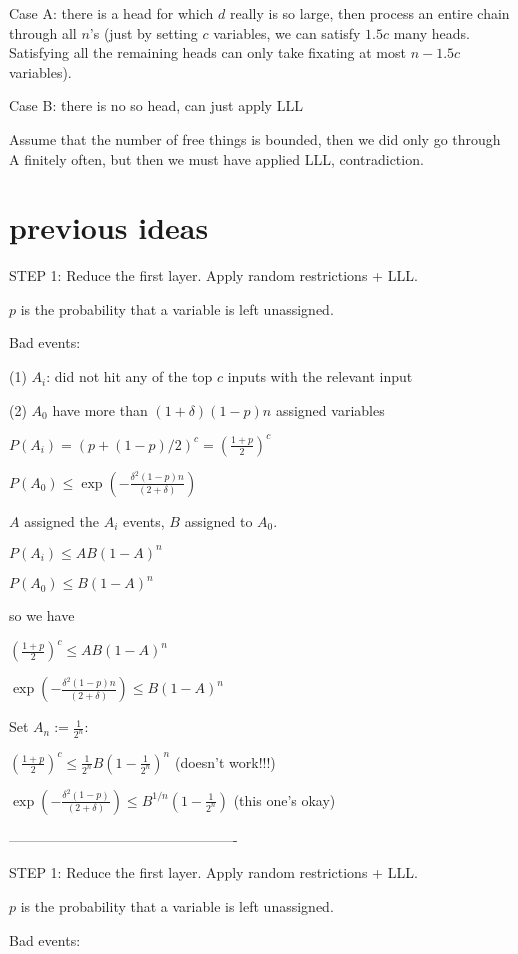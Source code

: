 \documentclass[11pt,a4paper]{article}
\begin{document}
Case A: there is a head for which $d$ really is so large, then process an entire chain through all $n$'s (just by setting $c$ variables, we can satisfy $1.5 c$ many heads. Satisfying all the remaining heads can only take fixating at most $n-1.5c$ variables).

Case B: there is no so head, can just apply LLL

Assume that the number of free things is bounded, then we did only go through A finitely often, but then we must have applied LLL, contradiction.


\section{previous ideas}

STEP 1: Reduce the first layer. Apply random restrictions + LLL.

$p$ is the probability that a variable is left unassigned.

Bad events:

(1) $A_i$: did not hit any of the top $c$ inputs with the relevant input

(2) $A_0$ have more than $(1+\delta)(1-p)n$ assigned variables

$P(A_i) = (p+(1-p)/2)^c = \left(\frac{1+p}{2}\right)^c$

$P(A_0) \leq \exp(-\frac{\delta^2(1-p)n}{(2+\delta)})$

$A$ assigned the $A_i$ events, $B$ assigned to $A_0$.


$P(A_i) \leq A B (1-A)^n$

$P(A_0) \leq B (1-A)^n$

so we have

$\left(\frac{1+p}{2}\right)^c \leq A B (1-A)^n$

$ \exp(-\frac{\delta^2(1-p)n}{(2+\delta)})  \leq B (1-A)^n$

Set $A_n := \frac{1}{2^n}$:


$\left(\frac{1+p}{2}\right)^c \leq \frac{1}{2^n} B (1-\frac{1}{2^n})^n$ (doesn't work!!!)

$ \exp(-\frac{\delta^2(1-p)}{(2+\delta)})  \leq B^{1/n} (1-\frac{1}{2^n})$ (this one's okay)


-------------------------------------------------


STEP 1: Reduce the first layer. Apply random restrictions + LLL.

$p$ is the probability that a variable is left unassigned.

Bad events:
\end{document}
